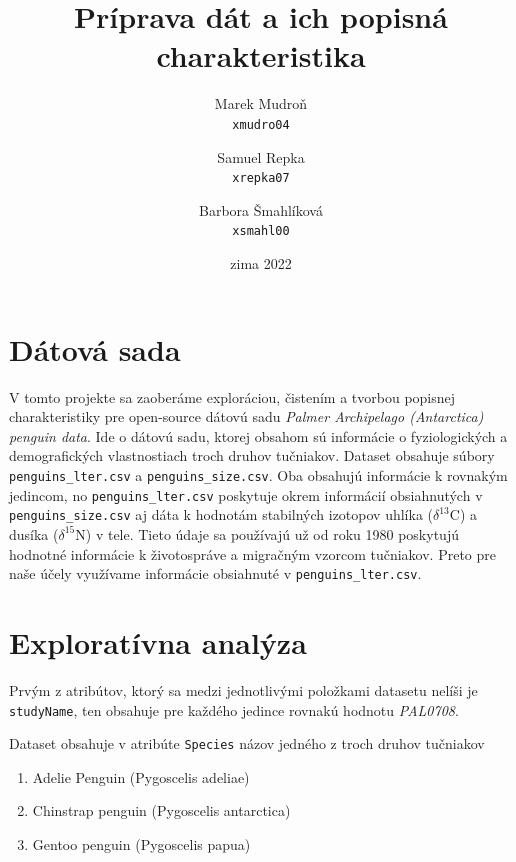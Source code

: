 \documentclass[10pt,xcolor=pdflatex,dvipsnames,table,oneside]{book}
\author{
  Marek Mudroň\\
  \texttt{xmudro04}
  \and
  Samuel Repka\\
  \texttt{xrepka07}
  \and
  Barbora Šmahlíková\\
  \texttt{xsmahl00}
}
\title{Príprava dát a ich popisná charakteristika}
\date{zima 2022}
\begin{document}

\hypersetup{pageanchor=false}%
\maketitle
\hypersetup{pageanchor=true}
\tableofcontents

\newpage%


\chapter{Dátová sada}

V tomto projekte sa zaoberáme exploráciou, čistením a tvorbou popisnej charakteristiky pre open-source dátovú sadu
\textit{Palmer Archipelago (Antarctica) penguin data}. Ide o dátovú sadu, ktorej obsahom sú informácie o fyziologických a demografických vlastnostiach troch druhov tučniakov. Dataset obsahuje súbory \texttt{penguins\_lter.csv} a \texttt{penguins\_size.csv}. Oba obsahujú informácie k rovnakým jedincom,  no \texttt{penguins\_lter.csv} poskytuje okrem informácií obsiahnutých v \texttt{penguins\_size.csv} aj dáta k hodnotám stabilných izotopov uhlíka  ($\delta^{13}$C)  a dusíka  ($\delta^{15}$N)  v tele. Tieto údaje sa používajú už od roku 1980  poskytujú hodnotné informácie k životospráve a migračným vzorcom tučniakov. Preto pre naše účely využívame informácie obsiahnuté v \texttt{penguins\_lter.csv}.

\chapter{Exploratívna analýza}

Prvým z atribútov, ktorý sa medzi jednotlivými položkami datasetu nelíši je \texttt{studyName}, ten obsahuje pre každého jedince rovnakú hodnotu \textit{PAL0708}.

Dataset obsahuje v atribúte \texttt{Species} názov jedného z troch druhov  tučniakov
\begin{enumerate}
  \item Adelie Penguin (Pygoscelis adeliae)
  \item Chinstrap penguin (Pygoscelis antarctica)
  \item Gentoo penguin (Pygoscelis papua)
\end{enumerate}
\end{document}
